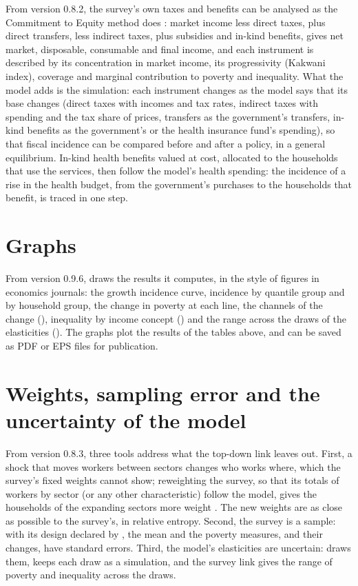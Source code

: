 From version 0.8.2, the survey's own taxes and benefits can be analysed as
the Commitment to Equity method does \citep{lustig2018}: market income less
direct taxes, plus direct transfers, less indirect taxes, plus subsidies and
in-kind benefits, gives net market, disposable, consumable and final income,
and each instrument is described by its concentration in market income, its
progressivity (Kakwani index), coverage and marginal contribution to poverty
and inequality. What the model adds is the simulation: each instrument
changes as the model says that its base changes (direct taxes with incomes
and tax rates, indirect taxes with spending and the tax share of prices,
transfers as the government's transfers, in-kind benefits as the government's
or the health insurance fund's spending), so that fiscal incidence can be
compared before and after a policy, in a general equilibrium. In-kind health
benefits valued at cost, allocated to the households that use the services,
then follow the model's health spending: the incidence of a rise in the
health budget, from the government's purchases to the households that
benefit, is traced in one step.

\section{Graphs}

From version 0.9.6,  draws the results it computes, in
the style of figures in economics journals: the growth incidence curve,
incidence by quantile group and by household group, the change in poverty at
each line, the channels of the change (), inequality by income
concept () and the range across the draws of the elasticities
(). The graphs plot the results of the tables above, and can be
saved as PDF or EPS files for publication.

\section{Weights, sampling error and the uncertainty of the model}

From version 0.8.3, three tools address what the top-down link leaves out.
First, a shock that moves workers between sectors changes who works where,
which the survey's fixed weights cannot show; reweighting the survey, so that
its totals of workers by sector (or any other characteristic) follow the
model, gives the households of the expanding sectors more weight
\citep{corral2022}. The new weights are as close as possible to the
survey's, in relative entropy. Second, the survey is a sample: with its
design declared by , the mean and the poverty measures, and
their changes, have standard errors. Third, the model's elasticities are
uncertain:  draws them, keeps each draw as a
simulation, and the survey link gives the range of poverty and inequality
across the draws.

